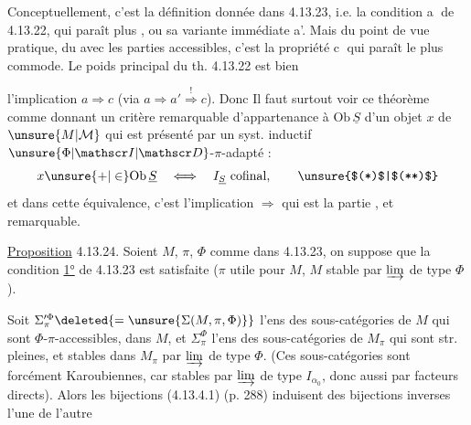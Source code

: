 Conceptuellement, c'est la définition donnée dans 4.13.23,  i.e. la condition \textcircled{a} de 4.13.22, qui paraît  plus , ou sa variante immédiate a'. Mais du point de vue pratique, du   avec les parties accessibles, c'est la propriété \textcircled{c} qui paraît le plus commode. Le poids principal du th. 4.13.22 est bien



l'implication $a\Longrightarrow c$ (via $a\Rightarrow a'\overset{!}{\Rightarrow}c$). Donc Il faut surtout voir ce théorème comme donnant un critère remarquable d'appartenance à $\mathrm{Ob}\,\underline S$ d'un objet $x$ de $\unsure{M|\mathcal M}$ qui est présenté par un syst. inductif $\unsure{\Phi|\mathscr I|\mathscr D}$-$\pi$-adapté :
\[
x\unsure{+|\in}\mathrm{Ob}\,\underline S\quad\Longleftrightarrow\quad I_{\underline S}\text{ cofinal},\tag*{\unsure{$(*)$|$(**)$}}
\]
et dans cette équivalence, c'est l'implication $\Longrightarrow$ qui est la partie  , et remarquable.

\uline{Proposition} 4.13.24. Soient \deleted{\unsure{$\Phi$}}$M$, $\pi$, $\Phi$ comme dans 4.13.23, \unsure{$*$} on suppose que  la condition \uline{1°} de  4.13.23 est satisfaite ($\pi$ utile pour $M$, $M$ stable par $\varinjlim$ de type $\Phi$).


Soit $\Sigma_\pi^{\prime\Phi}\deleted{=\unsure{\Sigma(M,\pi,\Phi)}}$ l'ens des sous-catégories   de $M$ qui sont  $\Phi$-$\pi$-accessibles, dans $M$, et $\Sigma^{\Phi}_\pi$ l'ens des sous-catégories  de $M_\pi$ qui sont str. pleines,  et stables dans $M_\pi$ par $\varinjlim$ de type $\Phi$. (Ces sous-catégories sont forcément Karoubiennes, car  stables par $\varinjlim$ de type $I_{\alpha_0}$, donc aussi par facteurs directs). Alors les bijections (4.13.4.1) (p.  288) induisent des bijections inverses l'une de l'autre

